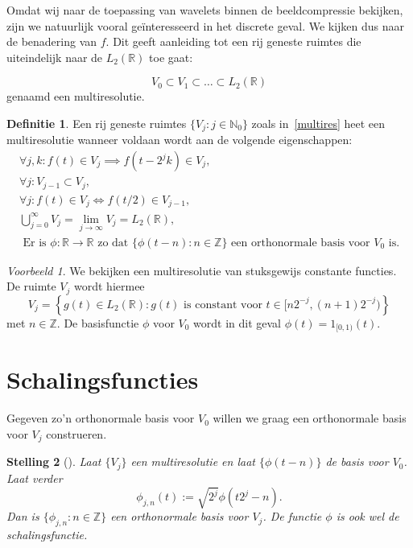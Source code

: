 \documentclass[11pt]{uvamath}
\newcommand{\R}{\mathbb{R}}
\newcommand{\N}{\mathbb{N}}
\newcommand{\Z}{\mathbb{Z}}
\theoremstyle{plain}
\newtheorem{stelling}{Stelling}[chapter]
\theoremstyle{definition}
\newtheorem{definitie}[stelling]{Definitie}
\theoremstyle{remark}
\newtheorem*{voorbeeld}{Voorbeeld}
\begin{document}
Omdat wij naar de toepassing van wavelets binnen de beeldcompressie bekijken, zijn we natuurlijk vooral ge\"interesseerd in het discrete geval. We kijken dus naar de benadering van $f$. Dit geeft aanleiding tot een rij geneste ruimtes die uiteindelijk naar de $L_2(\R)$ toe gaat:

\begin{equation}
  \label{multires}
  V_0 \subset V_1 \subset \ldots \subset L_2(\R)
\end{equation}
genaamd een multiresolutie.
\begin{definitie}
  Een rij geneste ruimtes $\{ V_j: j \in \N_0 \}$ zoals in~\ref{multires} heet een multiresolutie wanneer voldaan wordt aan de volgende eigenschappen:
  \begin{eqnarray}
    \forall j, k: f(t) \in V_j \implies f(t - 2^j k) \in V_j, \\
    \forall j: V_{j-1} \subset V_j, \\
    \forall j: f(t) \in V_j \iff f(t/2) \in V_{j-1}, \\
    \bigcup_{j=0}^{\infty} V_j = \lim_{j\to\infty} V_j = L_2(\R), \\
    \text{ Er is $\phi: \R \to \R$ zo dat $\{ \phi(t-n): n \in \Z \}$ een orthonormale basis voor $V_0$ is.}
  \end{eqnarray}
\end{definitie}

\begin{voorbeeld} We bekijken een multiresolutie van stuksgewijs constante functies. De ruimte $V_j$ wordt hiermee
  \[
  V_j = \left\{ g(t) \in L_2(\R): g(t)\text{ is constant voor }t \in [n 2^{-j}, (n+1)2^{-j}) \right \}
    \]
    met $n \in \Z$. De basisfunctie $\phi$ voor $V_0$ wordt in dit geval $\phi(t) = 1_{[0,1)}(t)$.
\end{voorbeeld}

\section{Schalingsfuncties}
Gegeven zo'n orthonormale basis voor $V_0$ willen we graag een orthonormale basis voor $V_j$ construeren.
\begin{stelling}[{\cite[T7.1]{mallat}}]
  Laat $\{ V_j \}$ een multiresolutie en laat $\{\phi(t-n) \}$ de basis voor $V_0$. Laat verder
  \[
  \phi_{j,n}(t) := \sqrt{2^j} \phi\left( t2^j - n \right).
  \]
  Dan is $\{ \phi_{j,n}: n \in \Z \}$ een orthonormale basis voor $V_j$. De functie $\phi$ is ook wel de \emph{schalingsfunctie}.
\end{stelling}
\end{document}
